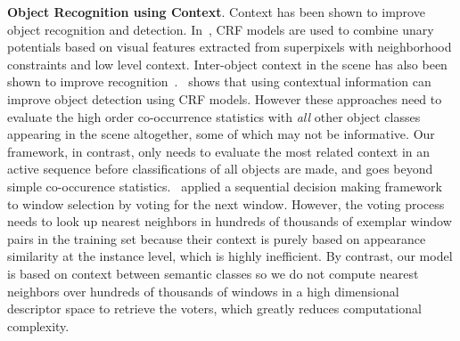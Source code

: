 {\bf Object Recognition using Context}. 
Context has been shown to improve object recognition and detection. In~\cite{gould2009decomposing, shotton2006textonboost, ladicky2010graph}, CRF models are used to combine unary potentials based on visual features extracted from superpixels with neighborhood constraints and low level context. Inter-object context in the scene has also been shown to improve recognition~\cite{galleguillos2010context, chen2011piecing}.~\cite{mottaghi2014role} shows that using contextual information can improve object detection using CRF models. However these approaches need to evaluate the high order co-occurrence statistics with \emph{all} other object classes appearing in the scene altogether, some of which may not be informative. Our framework, in contrast, only needs to evaluate the most related context in an active sequence before classifications of all objects are made, and goes beyond simple co-occurence statistics.~\cite{bogdan2012context} applied a sequential decision making framework to window selection by voting for the next window. However, the voting process needs to look up nearest neighbors in hundreds of thousands of exemplar window pairs in the training set because their context is purely based on appearance similarity at the instance level, which is highly inefficient. By contrast, our model is based on context between semantic classes so we do not compute nearest neighbors over hundreds of thousands of windows in a high dimensional descriptor space to retrieve the voters, which greatly reduces computational complexity.
